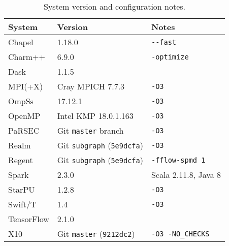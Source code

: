 \begin{table}[t]
\small
\begin{tabular}{l | l | l}
System & Version & Notes \\
\hline
Chapel & 1.18.0 & {\lstinline!--fast!} \\
Charm++ & 6.9.0 & {\lstinline!-optimize!} \\
Dask & 1.1.5 & \\
MPI(+X) & Cray MPICH 7.7.3 & {\lstinline!-O3!} \\
OmpSs & 17.12.1 & {\lstinline!-O3!} \\
OpenMP & Intel KMP 18.0.1.163 & {\lstinline!-O3!} \\
PaRSEC & Git {\lstinline!master!} branch & {\lstinline!-O3!} \\
Realm & Git {\lstinline!subgraph!} (\lstinline!5e9dcfa!) & {\lstinline!-O3!} \\
Regent & Git {\lstinline!subgraph!} (\lstinline!5e9dcfa!) & {\lstinline!-fflow-spmd 1!} \\
Spark & 2.3.0 & Scala 2.11.8, Java 8 \\
StarPU & 1.2.8 & {\lstinline!-O3!} \\
Swift/T & 1.4 & {\lstinline!-O3!} \\
TensorFlow & 2.1.0 & \\
X10 & Git {\lstinline!master!} (\lstinline!9212dc2!) & {\lstinline!-O3 -NO_CHECKS!}
\end{tabular}

\caption{System version and configuration notes.\label{tab:flags}}
\vspace{-0.5cm}
\end{table}
